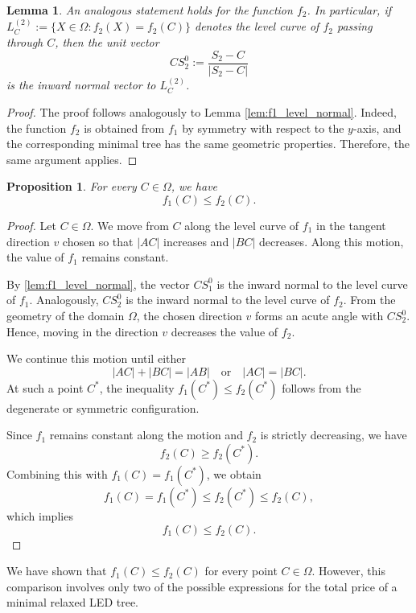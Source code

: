 \documentclass[openany]{book}
\newtheorem{proposition}{Proposition}
\newtheorem{lemma}{Lemma}
\begin{document}
	
	\begin{lemma}\label{lem:f2_normal}
		An analogous statement holds for the function \(f_2\). In particular, if
		\(L_C^{(2)} := \{X \in \Omega : f_2(X)=f_2(C)\}\) denotes the level curve
		of \(f_2\) passing through \(C\), then the unit vector
		\[
		CS_2^0 := \frac{S_2 - C}{|S_2 - C|}
		\]
		is the inward normal vector to \(L_C^{(2)}\).
	\end{lemma}
	
	\begin{proof}
		The proof follows analogously to Lemma \ref{lem:f1_level_normal}. Indeed, the
		function \(f_2\) is obtained from \(f_1\) by symmetry with respect to the
		\(y\)-axis, and the corresponding minimal tree has the same geometric
		properties. Therefore, the same argument applies.
	\end{proof}

	\begin{proposition}\label{prop:f1_leq_f2}
		For every \(C\in\Omega\), we have
		\[
		f_1(C)\leq f_2(C).
		\]
	\end{proposition}
	\begin{proof}
		Let \(C\in\Omega\). We move from \(C\) along the level curve of \(f_1\) in the
		tangent direction \(v\) chosen so that \(|AC|\) increases and \(|BC|\)
		decreases. Along this motion, the value of \(f_1\) remains constant.
		
		By \cref{lem:f1_level_normal}, the vector \(CS_1^0\) is the inward normal to
		the level curve of \(f_1\). Analogously, \(CS_2^0\) is the inward normal to the
		level curve of \(f_2\). From the geometry of the domain \(\Omega\), the chosen
		direction \(v\) forms an acute angle with \(CS_2^0\). Hence, moving in the
		direction \(v\) decreases the value of \(f_2\).
		
		We continue this motion until either
		\[
		|AC|+|BC|=|AB|
		\quad \text{or} \quad
		|AC|=|BC|.
		\]
		At such a point \(C^\ast\), the inequality \(f_1(C^\ast)\leq f_2(C^\ast)\)
		follows from the degenerate or symmetric configuration.
		
		Since \(f_1\) remains constant along the motion and \(f_2\) is strictly
		decreasing, we have
		\[
		f_2(C) \ge f_2(C^\ast).
		\]
		Combining this with \(f_1(C)=f_1(C^\ast)\), we obtain
		\[
		f_1(C)=f_1(C^\ast)\le f_2(C^\ast)\le f_2(C),
		\]
		which implies
		\[
		f_1(C)\le f_2(C).
		\]
	\end{proof}
	
	We have shown that \(f_1(C) \le f_2(C)\) for every point \(C \in \Omega\).
	However, this comparison involves only two of the possible expressions for the
	total price of a minimal relaxed LED tree.
	
\end{document}
